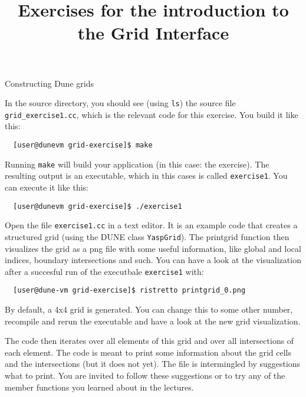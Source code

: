 \documentclass[12pt,a4paper]{article}
\title{\textbf{Exercises for the introduction to the Grid Interface}}
\begin{document}
\exerciseheader

\begin{Exercise}{Constructing Dune grids}

In the source directory, you should see (using \lstinline!ls!) the source file \lstinline!grid_exercise1.cc!,
which is the relevant code for this exercise. You build it like this:
\begin{lstlisting}
  [user@dunevm grid-exercise]$ make
\end{lstlisting}

Running \lstinline!make! will build your application (in this case: the exercise). The resulting output
is an executable, which in this cases is called \lstinline!exercise1!. You can execute it like this:

\begin{lstlisting}
  [user@dunevm grid-exercise]$ ./exercise1
\end{lstlisting}


Open the file \texttt{exercise1.cc} in a text editor.  It is an
example code that creates a structured grid (using the DUNE class
\texttt{YaspGrid}). The printgrid function then visualizes the grid
as a png file with some useful information, like global and local
indices, boundary intersections and such. You can have a look at the
visualization after a succesful run of the executbale \lstinline!exercise1!
with:

\begin{lstlisting}
  [user@dune-vm grid-exercise]$ ristretto printgrid_0.png
\end{lstlisting}

By default, a 4x4 grid is generated. You can change this to some
other number, recompile and rerun the executable and have a look at
the new grid visualization.

The code then iterates over all elements of this grid and
over all intersections of each element.  The code is meant to print
some information about the grid cells and the intersections (but it
does not yet).  The file is intermingled by suggestions what to print.
You are invited to follow these suggestions or to try any of the
member functions you learned about in the lectures.

\end{Exercise}
\end{document}
